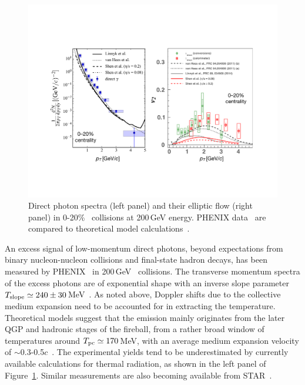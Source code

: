 \begin{figure}[tbh]
\centerline{\includegraphics[width=1.0\textwidth]{fig/gam-spec-v2-phenix} }
\caption[PHENIX results on direct photon spectra and flow compared to theory]{Direct photon spectra (left panel) and their elliptic flow (right panel) in 0-20\%
\AuAu\ collisions at 200\,GeV energy. PHENIX data~\cite{Adare:2011zr,Adare:2014fwh,Bannier:2014bja}
are compared to theoretical model calculations~\cite{vanHees:2011vb,Shen:2013cca,Linnyk:2013wma}.
}
\label{fig:phenix-gam}
\end{figure}
An excess signal of low-momentum direct photons, beyond expectations from binary
nucleon-nucleon collisions and final-state hadron decays, has been measured by
PHENIX~\cite{Adare:2008ab} in 200\,GeV \AuAu\ collisions. The transverse momentum spectra of 
the excess photons are of exponential shape with an inverse slope parameter 
$T_{\rm slope}\simeq 240\pm 30$\,MeV~\cite{Adare:2008ab,Adare:2014fwh}.
As noted above, Doppler shifts due to the collective medium expansion need to be accounted for
in extracting the temperature. Theoretical models suggest that the emission mainly originates
from the later QGP and hadronic stages of the fireball, from a rather broad window of
temperatures around $T_{\rm pc}\simeq170$\,MeV, with an average medium expansion velocity of
$\sim$0.3-0.5$c$~\cite{vanHees:2011vb,Shen:2013cca}. The experimental yields tend to be
underestimated by currently available calculations for thermal radiation, as shown in the left
panel of Figure~\ref{fig:phenix-gam}. Similar measurements are also becoming available
from STAR~\cite{Yang:2014mla}.

